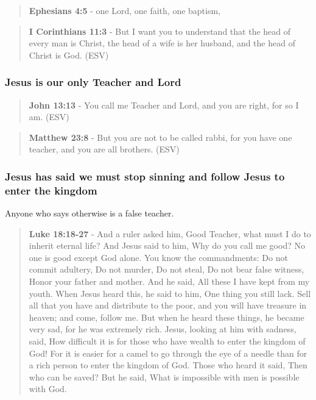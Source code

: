 \documentclass[11pt]{article}
\begin{document}
\begin{quote}
\textbf{Ephesians 4:5} - one Lord, one faith, one baptism,
\end{quote}

\begin{quote}
\textbf{I Corinthians 11:3} - But I want you to understand that the head of every man is Christ, the head of a wife is her husband, and the head of Christ is God. (ESV)
\end{quote}

\subsubsection{Jesus is our only Teacher and Lord}
\label{sec:orgb515c08}
\begin{quote}
\textbf{John 13:13} - You call me Teacher and Lord, and you are right, for so I am. (ESV)
\end{quote}

\begin{quote}
\textbf{Matthew 23:8} - But you are not to be called rabbi, for you have one teacher, and you are all brothers. (ESV)
\end{quote}

\subsubsection{Jesus has said we must stop sinning and follow Jesus to enter the kingdom}
\label{sec:org44c86f0}
Anyone who says otherwise is a false teacher.

\begin{quote}
\textbf{Luke 18:18-27} - And a ruler asked him, Good Teacher, what must I do to inherit eternal life? And Jesus said to him, Why do you call me good? No one is good except God alone. You know the commandments: Do not commit adultery, Do not murder, Do not steal, Do not bear false witness, Honor your father and mother. And he said, All these I have kept from my youth. When Jesus heard this, he said to him, One thing you still lack. Sell all that you have and distribute to the poor, and you will have treasure in heaven; and come, follow me. But when he heard these things, he became very sad, for he was extremely rich. Jesus, looking at him with sadness, said, How difficult it is for those who have wealth to enter the kingdom of God! For it is easier for a camel to go through the eye of a needle than for a rich person to enter the kingdom of God. Those who heard it said, Then who can be saved? But he said, What is impossible with men is possible with God.
\end{quote}
\end{document}
